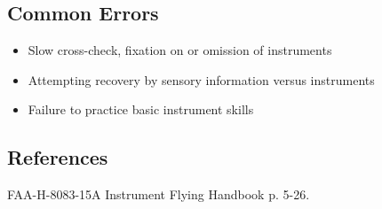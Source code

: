 \subsection{Common Errors}

\begin{itemize}
  \item Slow cross-check, fixation on or omission of instruments
  \item Attempting recovery by sensory information versus instruments
  \item Failure to practice basic instrument skills
\end{itemize}

\subsection{References}

FAA-H-8083-15A Instrument Flying Handbook p. 5-26.

